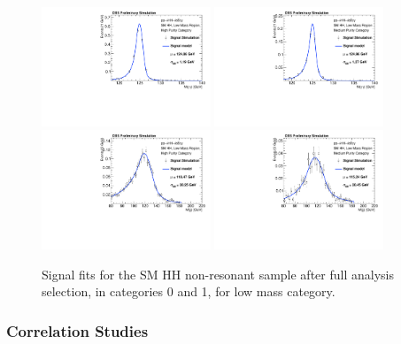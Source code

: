 \begin{figure}[h]
  \centering
  \includegraphics[width=0.45\textwidth]{figures/sec-signals/SMLM_signal_fit_mgg_cat0}\hfil
  \includegraphics[width=0.45\textwidth]{figures/sec-signals/SMLM_signal_fit_mgg_cat1}\hfil
  \includegraphics[width=0.45\textwidth]{figures/sec-signals/SMLM_signal_fit_mjj_cat0}\hfil
  \includegraphics[width=0.45\textwidth]{figures/sec-signals/SMLM_signal_fit_mjj_cat1}\hfil
  \caption{Signal fits for the SM HH non-resonant sample after full analysis selection, in categories 0 and 1, for low mass category.}
  \label{fig:sig_lowmassSM}
\end{figure}

\subsubsection{Correlation Studies}

